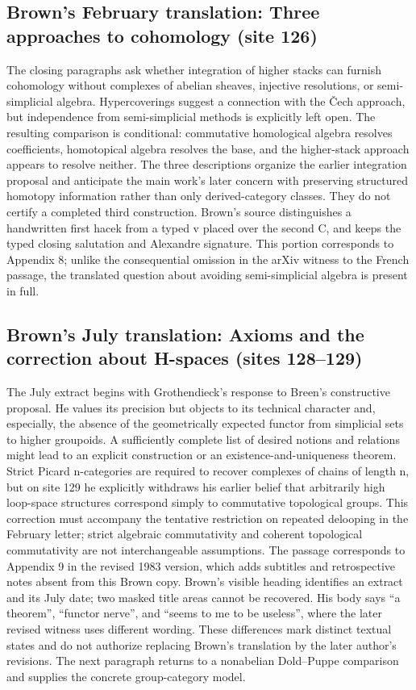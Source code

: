 \documentclass[10pt,oneside]{book}
\begin{document}
\subsection*{Brown's February translation: Three approaches to cohomology (site 126)}
The closing paragraphs ask whether integration of higher stacks can furnish cohomology without complexes of abelian sheaves, injective resolutions, or semi-simplicial algebra. Hypercoverings suggest a connection with the Čech approach, but independence from semi-simplicial methods is explicitly left open. The resulting comparison is conditional: commutative homological algebra resolves coefficients, homotopical algebra resolves the base, and the higher-stack approach appears to resolve neither. The three descriptions organize the earlier integration proposal and anticipate the main work's later concern with preserving structured homotopy information rather than only derived-category classes. They do not certify a completed third construction. Brown's source distinguishes a handwritten first hacek from a typed v placed over the second C, and keeps the typed closing salutation and Alexandre signature. This portion corresponds to Appendix 8; unlike the consequential omission in the arXiv witness to the French passage, the translated question about avoiding semi-simplicial algebra is present in full.

\subsection*{Brown's July translation: Axioms and the correction about H-spaces (sites 128--129)}
The July extract begins with Grothendieck's response to Breen's constructive proposal. He values its precision but objects to its technical character and, especially, the absence of the geometrically expected functor from simplicial sets to higher groupoids. A sufficiently complete list of desired notions and relations might lead to an explicit construction or an existence-and-uniqueness theorem. Strict Picard n-categories are required to recover complexes of chains of length n, but on site 129 he explicitly withdraws his earlier belief that arbitrarily high loop-space structures correspond simply to commutative topological groups. This correction must accompany the tentative restriction on repeated delooping in the February letter; strict algebraic commutativity and coherent topological commutativity are not interchangeable assumptions. The passage corresponds to Appendix 9 in the revised 1983 version, which adds subtitles and retrospective notes absent from this Brown copy. Brown's visible heading identifies an extract and its July date; two masked title areas cannot be recovered. His body says ``a theorem'', ``functor nerve'', and ``seems to me to be useless'', where the later revised witness uses different wording. These differences mark distinct textual states and do not authorize replacing Brown's translation by the later author's revisions. The next paragraph returns to a nonabelian Dold--Puppe comparison and supplies the concrete group-category model.
\end{document}
